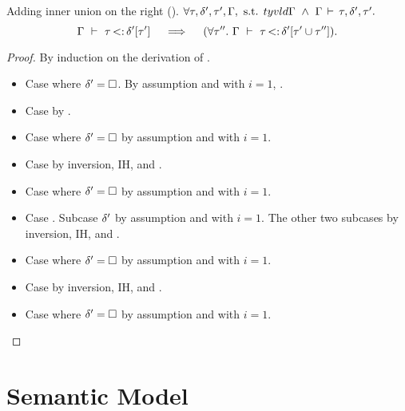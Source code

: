\begin{lemma}{Adding inner union on the right (\textbf{\lemref{}}).}%
\label{lem:add-inner-union-right:app}
    $\forall \tau, \delta', \tau', \Gamma, \text{ s.t. }
    tyvld{}{\Gamma}\ \land\ \Gamma\,\vdash\,\tau, \delta', \tau'.$
    \[
        \subtydflt{\ty}{\plug{\dctx'}{\ty'}}
        \quad\implies\quad
        (\forall \ty''.\ \subtydflt{\ty}{\plug{\dctx'}{\tyunion{\ty'}{\ty''}}}).
    \]
\end{lemma}
\begin{proof}
    By induction on the derivation of
    .
    \begin{itemize}
        \item Case  where $\delta'=\square$. By assumption
            \subtydflt{\ty}{\tyany} and  with $i=1$,
            .
        \item Case  by .
        \item Case  where $\delta'=\square$
            by assumption and  with $i=1$.
        \item Case  by inversion, IH, and .
        \item Case  where $\delta'=\square$
            by assumption and  with $i=1$.
        \item Case . 
            Subcase $\delta'$ by assumption and  with $i=1$.
            The other two subcases by inversion, IH, and .
        \item Case  where $\delta'=\square$
            by assumption and  with $i=1$.
        \item Case  by inversion, IH, and .
        \item Case  where $\delta'=\square$
            by assumption and  with $i=1$.
    \end{itemize}
\end{proof}

\clearpage
\section{Semantic Model}\label{sec:app:sem-sub}

